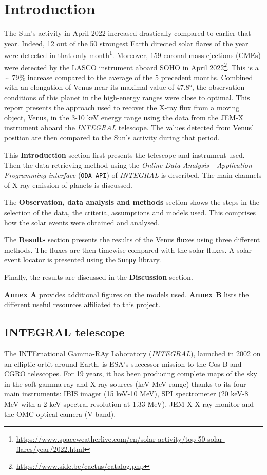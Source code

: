 \section{Introduction}
The Sun's activity in April 2022 increased drastically compared to earlier that year. Indeed, 12 out of the 50 strongest Earth directed solar flares of the year were detected in that only month\footnote{\url{https://www.spaceweatherlive.com/en/solar-activity/top-50-solar-flares/year/2022.html}}. Moreover, 159 coronal mass ejections (CMEs) were detected by the LASCO instrument aboard SOHO in April 2022\footnote{\url{https://www.sidc.be/cactus/catalog.php}}. This is a $\sim$ 79\% increase compared to the average of the 5 precedent months. Combined with an elongation of Venus near its maximal value of 47.8°, the observation conditions of this planet in the high-energy ranges were close to optimal. This report presents the approach used to recover the X-ray flux from a moving object, Venus, in the 3-10 keV energy range using the data from the JEM-X instrument aboard the \textit{INTEGRAL} telescope. The values detected from Venus' position are then compared to the Sun's activity during that period.

This \textbf{Introduction }section first presents the telescope and instrument used. Then the data retrieving method using the \textit{Online Data Analysis - Application Programming interface} (\texttt{ODA-API}) of \textit{INTEGRAL} is described. The main channels of X-ray emission of planets is discussed.

The \textbf{Observation, data analysis and methods} section shows the steps in the selection of the data, the criteria, assumptions and models used. This comprises how the solar events were obtained and analysed.

The \textbf{Results} section presents the results of the Venus fluxes using three different methods. The fluxes are then timewise compared with the solar fluxes. A solar event locator is presented using the \texttt{Sunpy} library.

Finally, the results are discussed in the \textbf{Discussion} section.

\textbf{Annex A} provides additional figures on the models used. \textbf{Annex B} lists the different useful resources affiliated to this project.

\subsection{INTEGRAL telescope}
The INTErnational Gamma-RAy Laboratory (\textit{INTEGRAL}), launched in 2002 on an elliptic orbit around Earth, is ESA's successor mission to the Cos-B and CGRO telescopes. For 19 years, it has been producing complete maps of the sky in the soft-gamma ray and X-ray sources (keV-MeV range) thanks to its four main instruments: IBIS imager (15 keV-10 MeV), SPI spectrometer (20 keV-8 MeV with a 2 keV spectral resolution at 1.33 MeV), JEM-X X-ray monitor and the OMC optical camera (V-band).
    
